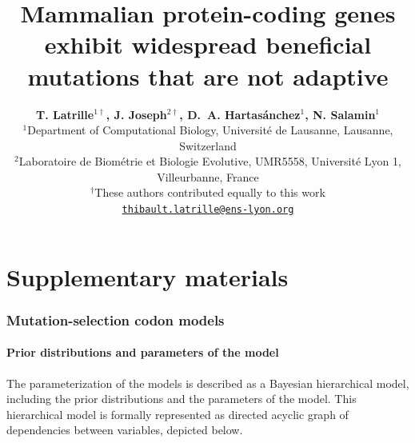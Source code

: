 \documentclass{article}
\title{\textbf{Mammalian protein-coding genes exhibit widespread beneficial mutations that are not adaptive}}
\author{
    \large
    \textbf{T. {Latrille}$^{1\dag}$\orcidlink{0000-0002-9643-4668}, J. {Joseph}$^{2\dag}$\orcidlink{0009-0002-1312-9930}, D.~A. {Hartasánchez}$^{1}$\orcidlink{0000-0003-2596-6883}, N. {Salamin}$^{1}$\orcidlink{0000-0002-3963-4954}}\\
    \scriptsize $^{1}$Department of Computational Biology, Université de Lausanne, Lausanne, Switzerland\\
    \scriptsize $^{2}$Laboratoire de Biométrie et Biologie Evolutive, UMR5558, Université Lyon 1, Villeurbanne, France \\
    \scriptsize $^{\dag}$These authors contributed equally to this work\\
    \normalsize \texttt{\href{mailto:thibault.latrille@ens-lyon.org}{thibault.latrille@ens-lyon.org}} \\
}
\date{}
\begin{document}
    \maketitle
    \part*{Supplementary materials}
    \tableofcontents

    \newpage
    \listoffigures

    \newpage
    \listoftables

    \clearpage
    \section{Mutation-selection codon models}\label{sec:mutsel}

    \subsection{Prior distributions and parameters of the model}\label{subsec:priors}

    The parameterization of the models is described as a Bayesian hierarchical model, including the prior distributions and the parameters of the model.
    This hierarchical model is formally represented as directed acyclic graph of dependencies between variables, depicted below.
\end{document}
